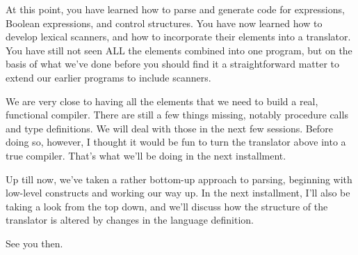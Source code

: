 At this point, you have learned how to parse  and  generate  code for expressions, Boolean  expressions, and  control structures. You have now learned how to develop lexical scanners, and  how to incorporate their elements into a translator. You have still not seen ALL the elements combined into one program, but on the basis of  what  we've  done before you should find it a straightforward matter to extend our earlier programs to include scanners.

We are very  close  to  having  all  the elements that we need to build a real, functional compiler. There are still a  few things missing, notably procedure  calls  and type definitions. We will deal with  those  in  the  next  few  sessions. Before doing so, however, I thought it  would  be fun to turn the translator above into a true compiler. That's what we'll  be  doing  in  the next installment.

Up till now, we've taken  a rather bottom-up approach to parsing, beginning with low-level constructs and working our way  up. In the next installment, I'll  also  be  taking a look from the top down, and  we'll  discuss how the structure of the translator is altered by changes in the language definition.

See you then.
